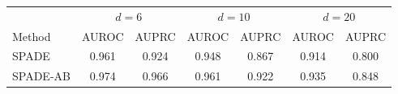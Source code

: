 \begin{tabular}{lcccccc}
\toprule
 & \multicolumn{2}{c}{$d{=}6$} & \multicolumn{2}{c}{$d{=}10$} & \multicolumn{2}{c}{$d{=}20$} \\
 Method & AUROC & AUPRC & AUROC & AUPRC & AUROC & AUPRC \\ \midrule
SPADE & 0.961 & 0.924 & 0.948 & 0.867 & 0.914 & 0.800 \\
SPADE-AB & 0.974 & 0.966 & 0.961 & 0.922 & 0.935 & 0.848 \\
\bottomrule
\end{tabular}
